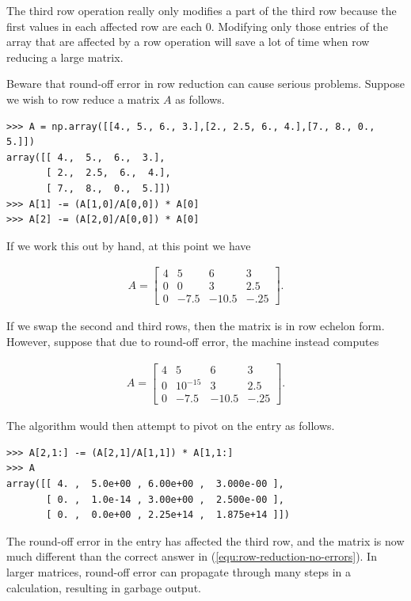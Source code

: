 The third row operation really only modifies a part of the third row because the first values in each affected row are each 0.
Modifying only those entries of the array that are affected by a row operation will save a lot of time when row reducing a large matrix.

Beware that round-off error in row reduction can cause serious problems.
Suppose we wish to row reduce a matrix $A$ as follows.

\begin{lstlisting}
>>> A = np.array([[4., 5., 6., 3.],[2., 2.5, 6., 4.],[7., 8., 0., 5.]])
array([[ 4.,  5.,  6.,  3.],
       [ 2.,  2.5,  6.,  4.],
       [ 7.,  8.,  0.,  5.]])
>>> A[1] -= (A[1,0]/A[0,0]) * A[0]
>>> A[2] -= (A[2,0]/A[0,0]) * A[0]
\end{lstlisting}

If we work this out by hand, at this point we have

\begin{align}
A = \left[\begin{array}{cccc}
4 &    5 &     6 &    3 \\
0 &    0 &     3 &  2.5 \\
0 & -7.5 & -10.5 & -.25
\end{array}\right].
\label{equ:row-reduction-no-errors}
\end{align}

If we swap the second and third rows, then the matrix is in row echelon form.
However, suppose that due to round-off error, the machine instead computes

\begin{align*}
A = \left[\begin{array}{cccc}
4 & 5        &     6 &    3 \\
0 & 10^{-15} &     3 &  2.5 \\
0 & -7.5     & -10.5 & -.25
\end{array}\right].
\end{align*}

The algorithm would then attempt to pivot on the  entry as follows.

\begin{lstlisting}
>>> A[2,1:] -= (A[2,1]/A[1,1]) * A[1,1:]
>>> A
array([[ 4. ,  5.0e+00 , 6.00e+00 ,  3.000e-00 ],
       [ 0. ,  1.0e-14 , 3.00e+00 ,  2.500e-00 ],
       [ 0. ,  0.0e+00 , 2.25e+14 ,  1.875e+14 ]])
\end{lstlisting}

The round-off error in the  entry has affected the third row, and the matrix is now much different than the correct answer in (\ref{equ:row-reduction-no-errors}).
In larger matrices, round-off error can propagate through many steps in a calculation, resulting in garbage output.

